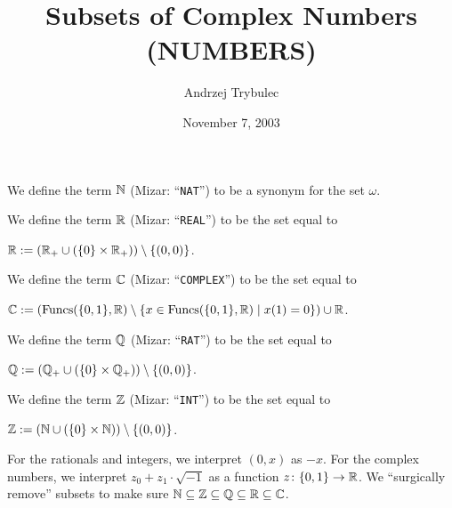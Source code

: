 \documentclass{article}
\title{Subsets of Complex Numbers (NUMBERS)}
\author{Andrzej Trybulec}
\date{November 7, 2003}
\begin{document}
\maketitle

\begin{notation}\index{$\NN$}%
We define the term $\NN$ (Mizar: ``\verb#NAT#'') to be a synonym for the
set $\omega$.
\end{notation}

\begin{definition}\index{$\RR$}%
We define the term $\RR$ (Mizar: ``\verb#REAL#'') to be the set equal to
\begin{defn}
\item $\mathbb{R} := (\mathbb{R}_{+}\cup(\{0\}\times\mathbb{R}_{+}))\setminus\{(0,0)\}$.
\end{defn}
\end{definition}

\begin{definition}\index{$\CC$}%
We define the term $\CC$ (Mizar: ``\verb#COMPLEX#'') to be the set equal to
\begin{defn}
\item $\mathbb{C}:=(\operatorname{Funcs}(\{0,1\},\mathbb{R})\setminus\{x\in\operatorname{Funcs}(\{0,1\},\mathbb{R})\mid x(1)=0\})\cup\mathbb{R}$.
\end{defn}\index{$\QQ$}%
We define the term $\QQ$ (Mizar: ``\verb#RAT#'') to be the set equal to
\begin{defn}
\item $\mathbb{Q}:=(\mathbb{Q}_{+}\cup(\{0\}\times\mathbb{Q}_{+}))\setminus\{(0,0)\}$.
\end{defn}\index{$\ZZ$}%
We define the term $\ZZ$ (Mizar: ``\verb#INT#'') to be the set equal to
\begin{defn}
\item $\mathbb{Z}:=(\mathbb{N}\cup(\{0\}\times\mathbb{N}))\setminus\{(0,0)\}$.
\end{defn}
\end{definition}
\begin{remark}
For the rationals and integers, we interpret $(0,x)$ as $-x$.
For the complex numbers, we interpret $z_{0}+z_{1}\cdot\sqrt{-1}$
as a function $z\colon\{0,1\}\to\mathbb{R}$.
We ``surgically remove'' subsets to make sure $\mathbb{N}\subseteq\mathbb{Z}\subseteq\mathbb{Q}\subseteq\mathbb{R}\subseteq\mathbb{C}$.
\end{remark}
\end{document}
